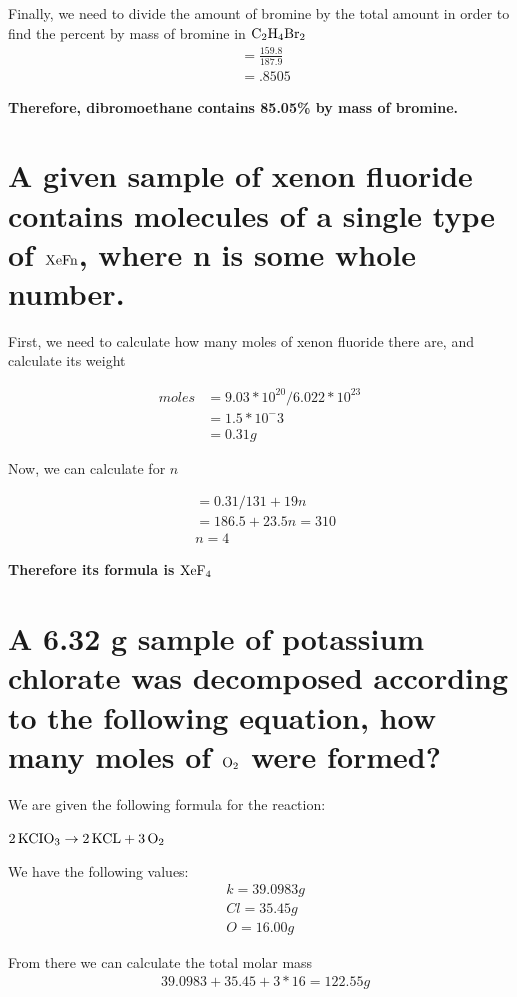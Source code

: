 \documentclass{scrartcl}
\begin{document}
Finally, we need to divide the amount of bromine by the total amount in order to
find the percent by mass of bromine in \(\ce{C2H4Br2}\)
\begin{align*}
&= \frac{159.8}{187.9}\\
&=.8505
\end{align*}

\textbf{Therefore, dibromoethane contains 85.05\% by mass of bromine.}

\section{A given sample of xenon fluoride contains molecules of a single type of \(\ce{XeFn}\), where n is some whole number.}
\label{sec:org79a7d50}
First, we need to calculate how many moles of xenon fluoride there are, and
calculate its weight

\begin{align*}
moles&=9.03*10^{20}/6.022*10^{23}\\
&= 1.5*10^-3\\
&= 0.31g
\end{align*}

Now, we can calculate for \(n\)

\begin{align*}
&= 0.31/131+19n\\
&= 186.5 + 23.5n = 310\\
&n = 4
\end{align*}

\textbf{Therefore its formula is \(\ce{XeF4}\)}

\section{A 6.32 g sample of potassium chlorate was decomposed according to the following equation, how many moles of \(\ce{O2}\) were formed?}
\label{sec:org555ddcf}
We are given the following formula for the reaction:

\(\ce{2KCIO3} \rightarrow\ce{2KCL}+ \ce{3O2}\)

We have the following values:
\begin{align*}
&k = 39.0983g\\
&Cl = 35.45g\\
&O = 16.00g
\end{align*}

From there we can calculate the total molar mass
\begin{align*}
&39.0983 + 35.45 + 3*16 = 122.55g
\end{align*}
\end{document}
